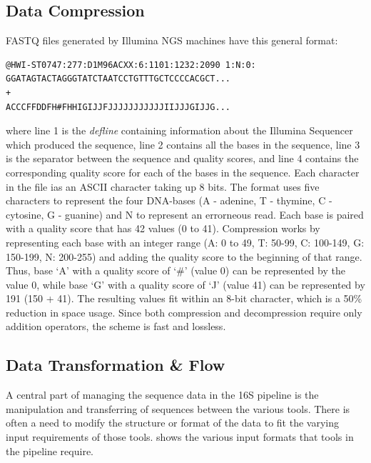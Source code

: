 \documentclass[12pt]{article}
\begin{document}

	\subsection{Data Compression} %
	\label{sub:data_compression}
	FASTQ files generated by Illumina NGS machines have this general format:
	
	\lstset{
		numbers=right
	}
	\begin{lstlisting}
@HWI-ST0747:277:D1M96ACXX:6:1101:1232:2090 1:N:0:
GGATAGTACTAGGGTATCTAATCCTGTTTGCTCCCCACGCT...
+
ACCCFFDDFH#FHHIGIJJFJJJJJJJJJJJIIJJJGIJJG...
	\end{lstlisting}
	where line 1 is the \emph{defline} containing information about the Illumina
	Sequencer which produced the sequence, line 2 contains all the bases in the 
	sequence, line 3 is the separator between the sequence and quality scores, and 
	line 4 contains the corresponding quality score for each of the bases in the 
	sequence. Each character in the file ias an ASCII character taking up 8 bits. 
	The format uses five characters to represent the four DNA-bases (A - adenine, T - thymine,
	C - cytosine, G - guanine) and N to represent an errorneous read. Each base is paired
	with a quality score that has 42 values (0 to 41). Compression works by representing
	each base with an integer range (A: 0 to 49, T: 50-99, C: 100-149, G: 150-199, N: 200-255)
	and adding the quality score to the beginning of that range. Thus, base `A' with a 
	quality score of `\#' (value 0) can be represented by the value 0, while base `G' with
	a quality score of `J' (value 41) can be represented by 191 (150 + 41). The resulting
	values fit within an 8-bit character, which is a 50\% reduction in space usage. 
	Since both compression and decompression require only addition operators, the scheme
	is fast and lossless.

	
	\subsection{Data Transformation \& Flow} %
	\label{sec:data_transformation}
	A central part of managing the sequence data in the 16S pipeline is the manipulation
	and transferring of sequences between the various tools. There is often a need
	to modify the structure or format of the data to fit the varying input requirements
	of those tools.  shows the various input formats that
	tools in the pipeline require.
\end{document}
